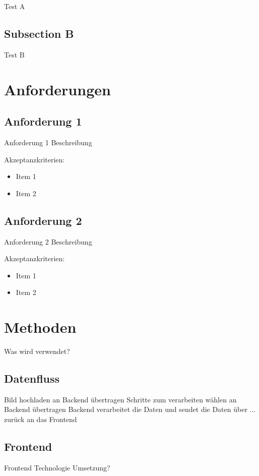 \documentclass[conference]{IEEEtran}
\begin{document}
Test A

\subsection{Subsection B}

Test B

\section{Anforderungen}

\subsection{Anforderung 1}

Anforderung 1 Beschreibung 

Akzeptanzkriterien: 
\begin{itemize}
	\item Item 1
	\item Item 2
\end{itemize}


\subsection{Anforderung 2}

Anforderung 2 Beschreibung

Akzeptanzkriterien:
\begin{itemize}
	\item Item 1
	\item Item 2
\end{itemize}





\section{Methoden}
Was wird verwendet?

\subsection{Datenfluss}
Bild hochladen  an Backend übertragen
Schritte zum verarbeiten wählen an Backend übertragen
Backend verarbeitet die Daten und sendet die Daten über ... zurück an das Frontend

\subsection{Frontend}
Frontend Technologie
Umsetzung?
\end{document}
